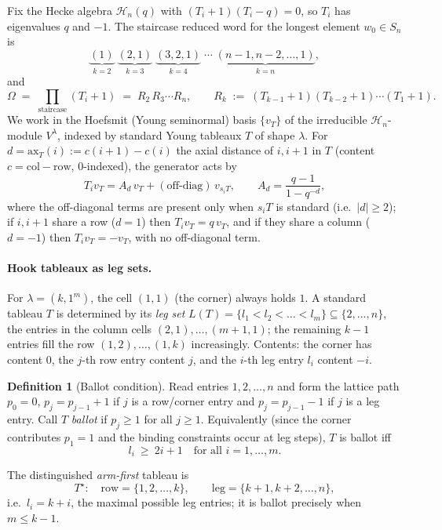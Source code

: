 \documentclass[11pt]{article}
\theoremstyle{definition}
\newtheorem{definition}[theorem]{Definition}
\newcommand{\Om}{\Omega}
\newcommand{\HH}{\mathcal{H}}
\newcommand{\la}{\lambda}
\begin{document}
Fix the Hecke algebra $\HH_n(q)$ with $(T_i+1)(T_i-q)=0$, so $T_i$ has eigenvalues $q$ and
$-1$. The staircase reduced word for the longest element $w_0\in S_n$ is
\[
  \underbrace{(1)}_{k=2}\;\underbrace{(2,1)}_{k=3}\;\underbrace{(3,2,1)}_{k=4}\;\cdots\;
  \underbrace{(n{-}1,n{-}2,\dots,1)}_{k=n},
\]
and
\[
  \Om \;=\; \prod_{\text{staircase}}(T_i+1)
        \;=\; R_2\,R_3\cdots R_n,
  \qquad
  R_k \;:=\; (T_{k-1}+1)(T_{k-2}+1)\cdots(T_1+1).
\]
We work in the Hoefsmit (Young seminormal) basis $\{v_T\}$ of the irreducible
$\HH_n$-module $V^\la$, indexed by standard Young tableaux $T$ of shape $\la$. For
$d=\mathrm{ax}_T(i):=c(i{+}1)-c(i)$ the axial distance of $i,i{+}1$ in $T$ (content
$c=\text{col}-\text{row}$, $0$-indexed), the generator acts by
\[
  T_i v_T = A_d\, v_T + (\text{off-diag})\,v_{s_iT},\qquad A_d=\frac{q-1}{1-q^{-d}},
\]
where the off-diagonal terms are present only when $s_iT$ is standard (i.e.\ $|d|\ge 2$);
if $i,i{+}1$ share a row ($d=1$) then $T_iv_T=q\,v_T$, and if they share a column ($d=-1$)
then $T_iv_T=-v_T$, with no off-diagonal term.

\paragraph{Hook tableaux as leg sets.}
For $\la=(k,1^m)$, the cell $(1,1)$ (the corner) always holds $1$. A standard tableau $T$ is
determined by its \emph{leg set} $L(T)=\{l_1<l_2<\dots<l_m\}\subseteq\{2,\dots,n\}$, the
entries in the column cells $(2,1),\dots,(m{+}1,1)$; the remaining $k-1$ entries fill the row
$(1,2),\dots,(1,k)$ increasingly. Contents: the corner has content $0$, the $j$-th row entry
content $j$, and the $i$-th leg entry $l_i$ content $-i$.

\begin{definition}[Ballot condition]\label{def:ballot}
Read entries $1,2,\dots,n$ and form the lattice path $p_0=0$, $p_j=p_{j-1}+1$ if $j$ is a
row/corner entry and $p_j=p_{j-1}-1$ if $j$ is a leg entry. Call $T$ \emph{ballot} if
$p_j\ge 1$ for all $j\ge 1$. Equivalently (since the corner contributes $p_1=1$ and the binding
constraints occur at leg steps), $T$ is ballot iff
\[
  \boxed{\,l_i\ \ge\ 2i+1\quad\text{for all }i=1,\dots,m.\,}
\]
\end{definition}

\noindent
The distinguished \emph{arm-first} tableau is
\[
  T^\star:\quad \text{row}=\{1,2,\dots,k\},\qquad \text{leg}=\{k{+}1,k{+}2,\dots,n\},
\]
i.e.\ $l_i=k+i$, the maximal possible leg entries; it is ballot precisely when $m\le k-1$.
\end{document}
